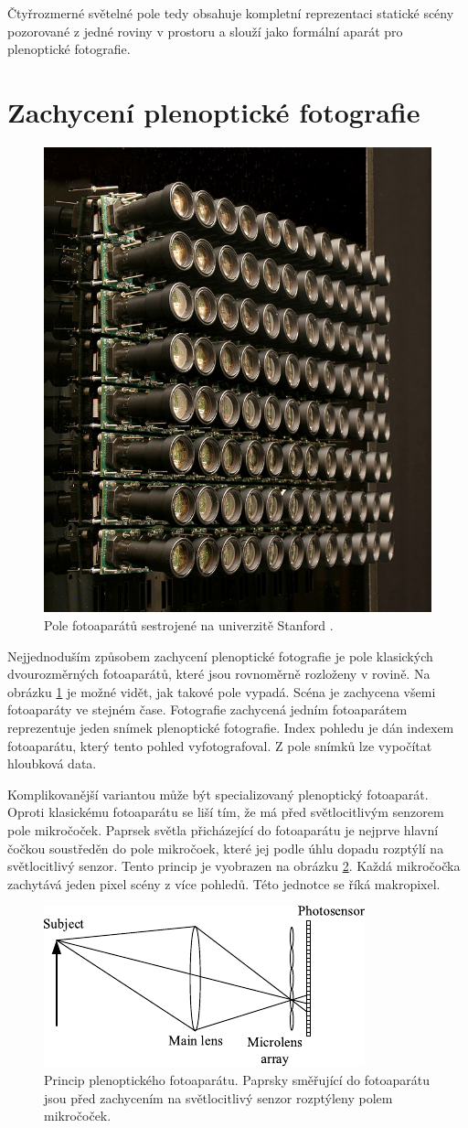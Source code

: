 Čtyřrozmerné světelné pole tedy obsahuje kompletní reprezentaci statické scény pozorované z jedné roviny v prostoru a slouží jako formální aparát pro plenoptické fotografie.

\section{Zachycení plenoptické fotografie}
\label{light-field-capture}
\begin{figure}[h]
  \centering
  \includegraphics[width=.4\textwidth]{obrazky-figures/stanford-array.jpg}
	\caption{Pole fotoaparátů sestrojené na univerzitě Stanford \cite{stanford}.}
	\label{stanfordArray}
\end{figure}

Nejjednoduším způsobem zachycení plenoptické fotografie je pole klasických dvourozměrných fotoaparátů, které jsou rovnoměrně rozloženy v rovině.
Na obrázku \ref{stanfordArray} je možné vidět, jak takové pole vypadá.
Scéna je zachycena všemi fotoaparáty ve stejném čase.
Fotografie zachycená jedním fotoaparátem reprezentuje jeden snímek plenoptické fotografie.
Index pohledu je dán indexem fotoaparátu, který tento pohled vyfotografoval.
Z pole snímků lze vypočítat hloubková data.

Komplikovanější variantou může být specializovaný plenoptický fotoaparát.
Oproti klasickému fotoaparátu se liší tím, že má před světlocitlivým senzorem pole mikročoček.
Paprsek světla přicházející do fotoaparátu je nejprve hlavní čočkou soustředěn do pole mikročoek, které jej podle úhlu dopadu rozptýlí na světlocitlivý senzor.
Tento princip je vyobrazen na obrázku \ref{plenoPrincip}.
Každá mikročočka zachytává jeden pixel scény z více pohledů.
Této jednotce se říká makropixel.

\begin{figure}
	\centering
		\includegraphics[width=.4\textwidth]{obrazky-figures/pleno-cam.pdf}
		\caption{Princip plenoptického fotoaparátu. Paprsky směřující do fotoaparátu jsou před zachycením na světlocitlivý senzor rozptýleny polem mikročoček.}
		\label{plenoPrincip}
\end{figure}

